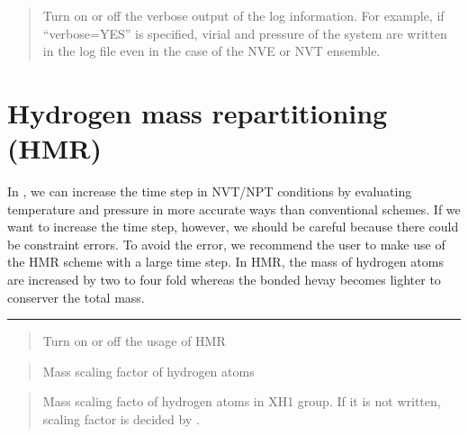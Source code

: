 \documentclass[a4paper,11pt,oneside,english]{sphinxmanual}
\begin{document}
 
\begin{quote}


Turn on or off the verbose output of the log information.
For example, if “verbose=YES” is specified,
virial and pressure of the system are written in the log file
even in the case of the NVE or NVT ensemble.
\end{quote}


\section{Hydrogen mass repartitioning (HMR)}
\label{\detokenize{06_Dynamics:hydrogen-mass-repartitioning-hmr}}
In , we can increase the time step in NVT/NPT conditions by evaluating temperature
and pressure in more accurate ways than conventional schemes. If we want to increase the time step, however,
we should be careful because there could be constraint errors. To avoid the error, we recommend the user to
make use of the HMR scheme with a large time step. In HMR, the mass of hydrogen atoms are increased by two to four
fold whereas the bonded hevay becomes lighter to conserver the total mass.


\bigskip\hrule\bigskip


 
\begin{quote}


Turn on or off the usage of HMR
\end{quote}

 
\begin{quote}


Mass scaling factor of hydrogen atoms
\end{quote}

 
\begin{quote}


Mass scaling facto of hydrogen atoms in XH1 group. If it is not written, scaling factor is decided by .
\end{quote}
\end{document}
